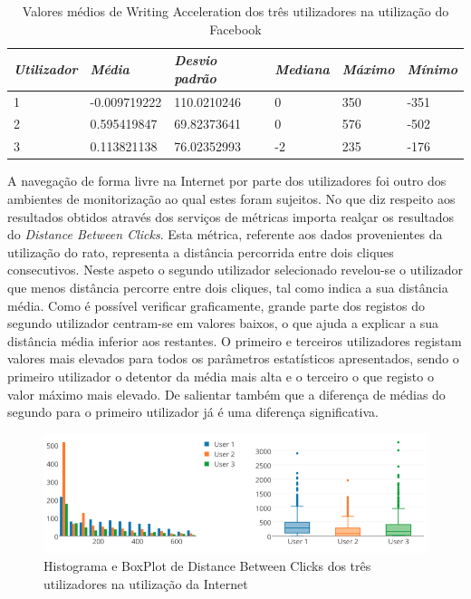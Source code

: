 {\renewcommand{\arraystretch}{1.6}
\begin{table}[!htb]
\centering
\label{tab:a_tbk}
\vspace{2pt}
\begin{tabular}{ | l | l | l | l | l | l |  }
\hline
\textit{Utilizador}&\textit{Média}&\textit{Desvio padrão}&\textit{Mediana} & \textit{Máximo} & \textit{Mínimo}\\  
\hline
1&-0.009719222&110.0210246&0&350&-351 \\
2&0.595419847&69.82373641&0&576&-502 \\
3&0.113821138&76.02352993&-2&235&-176 \\
\hline
\end{tabular}
\caption{Valores médios de Writing Acceleration dos três utilizadores na utilização do Facebook} 
\end{table}}



A navegação de forma livre na Internet por parte dos utilizadores foi outro dos ambientes de monitorização ao qual estes foram sujeitos. No que diz respeito aos resultados obtidos através dos serviços de métricas importa realçar os resultados do \textit{Distance Between Clicks}. Esta métrica, referente aos dados provenientes da utilização do rato, representa a distância percorrida entre dois cliques consecutivos. Neste aspeto o segundo utilizador selecionado revelou-se o utilizador que menos distância percorre entre dois cliques, tal como indica a sua distância média. Como é possível verificar graficamente, grande parte dos registos do segundo utilizador centram-se em valores baixos, o que ajuda a explicar a sua distância média inferior aos restantes. O primeiro e terceiros utilizadores registam valores mais elevados para todos os parâmetros estatísticos apresentados, sendo o primeiro utilizador o detentor da média mais alta e o terceiro o que registo o valor máximo mais elevado. De salientar também que a diferença de médias do segundo para o primeiro utilizador já é uma diferença significativa.


\begin{figure}[htb]
   \centering
   \includegraphics[scale=0.45]{Images/distancebetweenclicksnet.png}
   \caption{Histograma e BoxPlot de Distance Between Clicks dos três utilizadores na utilização da Internet}
\end{figure}

